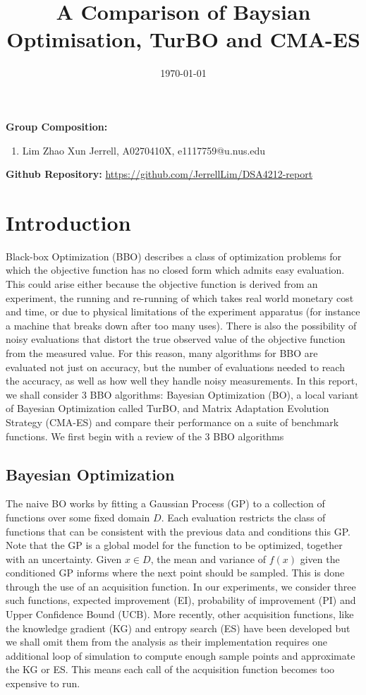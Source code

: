 \documentclass[12pt]{article}
\begin{document}
\title{A Comparison of Baysian Optimisation, TurBO and CMA-ES}
\date{\today}
\maketitle

{\bf Group Composition:}
\begin{enumerate}
\item Lim Zhao Xun Jerrell, A0270410X, e1117759@u.nus.edu
\end{enumerate}

{\bf Github Repository:} \url{https://github.com/JerrellLim/DSA4212-report}

%
\section{Introduction}
Black-box Optimization (BBO) describes a class of optimization problems for which the objective function has no closed form which admits easy evaluation. This could arise either because the objective function is derived from an experiment, the running and re-running of which takes real world monetary cost and time, or due to physical limitations of the experiment apparatus (for instance a machine that breaks down after too many uses). There is also the possibility of noisy evaluations that distort the true observed value of the objective function from the measured value. For this reason, many algorithms for BBO are evaluated not just on accuracy, but the number of evaluations needed to reach the accuracy, as well as how well they handle noisy measurements. In this report, we shall consider 3 BBO algorithms: Bayesian Optimization (BO), a local variant of Bayesian Optimization called TurBO, and 
Matrix Adaptation Evolution Strategy (CMA-ES) and compare their performance on a suite of benchmark functions. We first begin with a review of the 3 BBO algorithms

\subsection{Bayesian Optimization}
The naive BO works by fitting a Gaussian Process (GP) to a collection of functions over some fixed domain $D$. Each evaluation restricts the class of functions that can be consistent with the previous data and conditions this GP. Note that the GP is a global model for the function to be optimized, together with an uncertainty. Given $x \in D$, the mean and variance of $f(x)$ given the conditioned GP informs where the next point should be sampled. This is done through the use of an acquisition function. In our experiments, we consider three such functions, expected improvement (EI), probability of improvement (PI) and Upper Confidence Bound (UCB). More recently, other acquisition functions, like the knowledge gradient (KG) and entropy search (ES) have been developed but we shall omit them from the analysis as their implementation requires one additional loop of simulation to compute enough sample points and approximate the KG or ES. This means each call of the acquisition function becomes too expensive to run. \\
\end{document}
